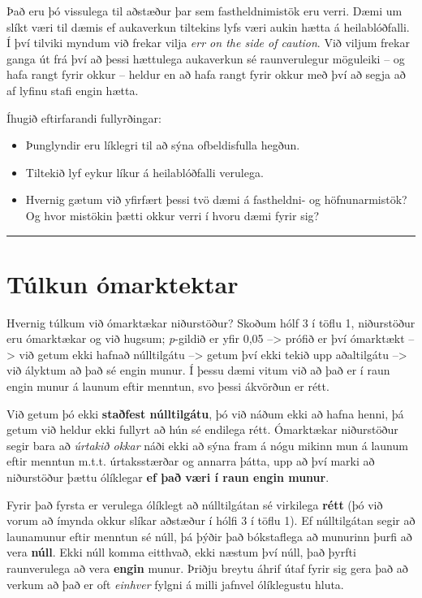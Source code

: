 \documentclass[
]{book}
\begin{document}
Það eru þó vissulega til aðstæður þar sem fastheldnimistök eru verri. Dæmi um slíkt væri til dæmis ef aukaverkun tiltekins lyfs væri aukin hætta á heilablóðfalli. Í því tilviki myndum við frekar vilja \emph{err on the side of caution}. Við viljum frekar ganga út frá því að þessi hættulega aukaverkun sé raunverulegur möguleiki -- og hafa rangt fyrir okkur -- heldur en að hafa rangt fyrir okkur með því að segja að af lyfinu stafi engin hætta.

Íhugið eftirfarandi fullyrðingar:

\begin{itemize}
\item
  Þunglyndir eru líklegri til að sýna ofbeldisfulla hegðun.
\item
  Tiltekið lyf eykur líkur á heilablóðfalli verulega.
\item
  Hvernig gætum við yfirfært þessi tvö dæmi á fastheldni- og höfnunarmistök? Og hvor mistökin þætti okkur verri í hvoru dæmi fyrir sig?
\end{itemize}

\begin{center}\rule{0.5\linewidth}{0.5pt}\end{center}

\hypertarget{tuxfalkun-uxf3marktektar}{%
\section{Túlkun ómarktektar}\label{tuxfalkun-uxf3marktektar}}

Hvernig túlkum við ómarktækar niðurstöður? Skoðum hólf 3 í töflu 1, niðurstöður eru ómarktækar og við hugsum; \emph{p}-gildið er yfir 0,05 --\textgreater{} prófið er því ómarktækt --\textgreater{} við getum ekki hafnað núlltilgátu --\textgreater{} getum því ekki tekið upp aðaltilgátu --\textgreater{} við ályktum að það sé engin munur. Í þessu dæmi vitum við að það er í raun engin munur á launum eftir menntun, svo þessi ákvörðun er rétt.

Við getum þó ekki \textbf{staðfest núlltilgátu}, þó við náðum ekki að hafna henni, þá getum við heldur ekki fullyrt að hún sé endilega rétt. Ómarktækar niðurstöður segir bara að \emph{úrtakið okkar} náði ekki að sýna fram á nógu mikinn mun á launum eftir menntun m.t.t. úrtaksstærðar og annarra þátta, upp að því marki að niðurstöður þættu ólíklegar \textbf{ef það væri í raun engin munur}.

Fyrir það fyrsta er verulega ólíklegt að núlltilgátan sé virkilega \textbf{rétt} (þó við vorum að ímynda okkur slíkar aðstæður í hólfi 3 í töflu 1). Ef núlltilgátan segir að launamunur eftir menntun sé núll, þá þýðir það bókstaflega að munurinn þurfi að vera \textbf{núll}. Ekki núll komma eitthvað, ekki næstum því núll, það þyrfti raunverulega að vera \textbf{engin} munur. Þriðju breytu áhrif útaf fyrir sig gera það að verkum að það er oft \emph{einhver} fylgni á milli jafnvel ólíklegustu hluta.
\end{document}
